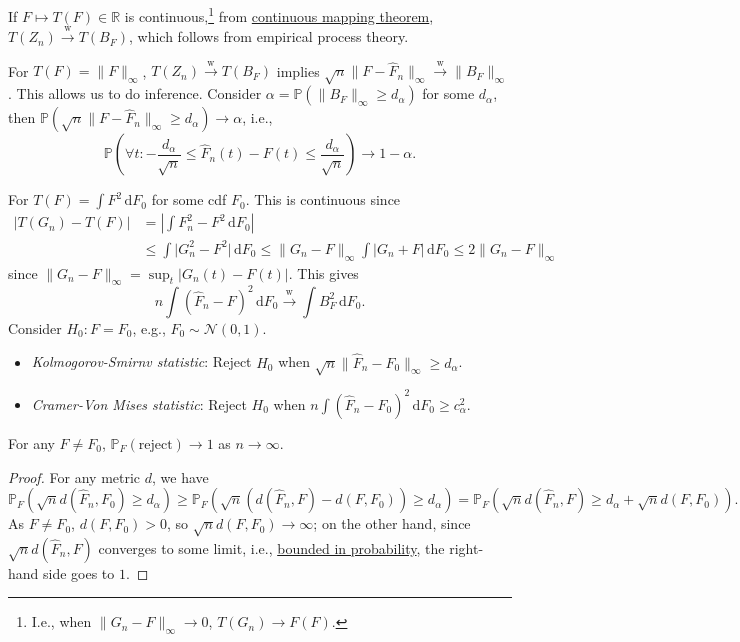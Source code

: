 If \(F \mapsto T(F) \in \mathbb{R} \) is continuous,\footnote{I.e., when \(\lVert G_n - F \rVert _\infty \to 0\), \(T(G_n) \to F(F)\).} from \hyperref[thm:continuous-mapping]{continuous mapping theorem}, \(T(Z_n) \overset{\text{w} }{\to} T(B_F)\), which follows from empirical process theory.

\begin{eg}
	For \(T(F) = \lVert F \rVert _\infty \), \(T(Z_n) \overset{\text{w} }{\to} T(B_F)\) implies \(\sqrt{n} \lVert F - \hat{F} _n \rVert _\infty \overset{\text{w} }{\to} \lVert B_F \rVert _\infty\). This allows us to do inference. Consider \(\alpha = \mathbb{P} (\lVert B_F \rVert _\infty \geq d_\alpha )\) for some \(d_\alpha \), then \(\mathbb{P} (\sqrt{n} \lVert F - \hat{F} _n \rVert _\infty \geq d_\alpha ) \to \alpha\), i.e.,
	\[
		\mathbb{P} \left(\forall t \colon - \frac{d_\alpha }{\sqrt{n} } \leq \hat{F} _n(t) - F(t) \leq \frac{d_\alpha }{\sqrt{n} } \right) \to 1 - \alpha .
	\]
\end{eg}

\begin{eg}
	For \(T(F) = \int F^2 \,\mathrm{d} F_0\) for some cdf \(F_0\). This is continuous since
	\[
		\begin{split}
			\vert T(G_n) - T(F) \vert
			 & = \left\vert \int F^2_n - F^2 \,\mathrm{d} F_0 \right\vert \\
			 & \leq \int \vert G_n^2 - F^2 \vert \,\mathrm{d} F_0
			\leq \lVert G_n - F \rVert _\infty \int \vert G_n + F \vert \,\mathrm{d} F_0
			\leq 2 \lVert G_n - F \rVert _\infty
		\end{split}
	\]
	since \(\lVert G_n - F \rVert _\infty = \sup _t \vert G_n(t) - F(t) \vert \). This gives
	\[
		n \int (\hat{F} _n - F)^2 \,\mathrm{d} F_0
		\overset{\text{w} }{\to} \int B_F^2 \,\mathrm{d} F_0.
	\]
	Consider \(H_0 \colon F = F_0\), e.g., \(F_0 \sim \mathcal{N} (0, 1)\).
	\begin{itemize}
		\item \emph{Kolmogorov-Smirnv statistic}: Reject \(H_0\) when \(\sqrt{n} \lVert \hat{F} _n - F_0 \rVert _\infty \geq d_\alpha \).
		\item \emph{Cramer-Von Mises statistic}: Reject \(H_0\) when \(n \int (\hat{F} _n - F_0)^2 \,\mathrm{d} F_0 \geq c_\alpha ^2\).
	\end{itemize}
\end{eg}

\begin{proposition}
	For any \(F \neq F_0\), \(\mathbb{P} _F(\text{reject} ) \to 1\) as \(n \to \infty \).
\end{proposition}
\begin{proof}
	For any metric \(d\), we have
	\[
		\mathbb{P} _F (\sqrt{n} d(\hat{F} _n, F_0) \geq d_\alpha )
		\geq \mathbb{P} _F(\sqrt{n} (d(\hat{F} _n, F) - d(F, F_0))\geq d_\alpha )
		= \mathbb{P} _F(\sqrt{n} d(\hat{F} _n, F) \geq d_\alpha + \sqrt{n} d(F, F_0)).
	\]
	As \(F \neq F_0\), \(d(F, F_0) > 0\), so \(\sqrt{n} d(F, F_0) \to \infty \); on the other hand, since \(\sqrt{n} d(\hat{F} _n, F)\) converges to some limit, i.e., \hyperref[def:bounded-in-probability]{bounded in probability}, the right-hand side goes to \(1\).
\end{proof}

